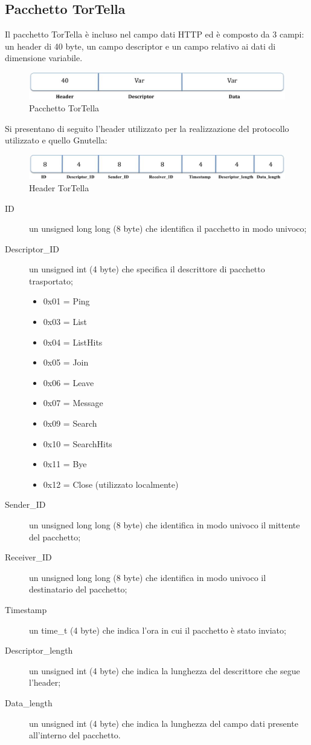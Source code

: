 \subsection{Pacchetto TorTella}
Il pacchetto TorTella è incluso nel campo dati HTTP ed è composto da 3 campi: un header di 40 byte, un campo descriptor e un campo relativo ai dati di dimensione variabile.
\begin{figure}[H]
\begin{center}
\includegraphics[scale=0.38]{etc/tortellapacket.jpg}
\caption{Pacchetto TorTella}
\label{tortellapacket}
\end{center}
\end{figure}
Si presentano di seguito l’header utilizzato per la realizzazione del protocollo utilizzato e quello Gnutella:
\begin{figure}[H]
\begin{center}
\includegraphics[scale=0.38]{etc/tortellaheader.jpg}
\caption{Header TorTella}
\label{tortellaheader}
\end{center}
\end{figure}
\begin{description}
\item[ID] un unsigned long long (8 byte) che identifica il pacchetto in modo univoco;
\item[Descriptor\_ID] un unsigned int (4 byte) che specifica il descrittore di pacchetto trasportato;
\begin{itemize}
	\item 0x01 = Ping
	\item 0x03 = List
	\item 0x04 = ListHits
	\item 0x05 = Join
	\item 0x06 = Leave
	\item 0x07 = Message
	\item 0x09 = Search
	\item 0x10 = SearchHits
	\item 0x11 = Bye
	\item 0x12 = Close (utilizzato localmente)
\end{itemize}
\item[Sender\_ID] un unsigned long long (8 byte) che identifica in modo univoco il mittente del pacchetto;
\item[Receiver\_ID] un unsigned long long (8 byte) che identifica in modo univoco il destinatario del pacchetto;
\item[Timestamp] un time\_t (4 byte) che indica l’ora in cui il pacchetto è stato inviato;
\item[Descriptor\_length] un unsigned int (4 byte) che indica la lunghezza del descrittore che segue l’header;
\item[Data\_length] un unsigned int (4 byte) che indica la lunghezza del campo dati presente all’interno del pacchetto.
\end{description}

